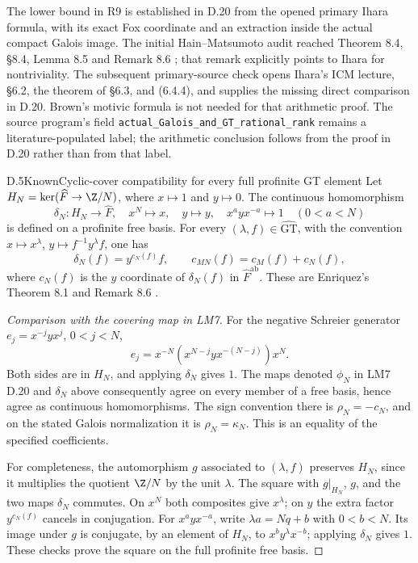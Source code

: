 The lower bound in R9 is established in D.20 from the opened primary
Ihara formula, with its exact Fox coordinate and an extraction inside
the actual compact Galois image. The initial Hain--Matsumoto audit
reached Theorem 8.4, \S8.4, Lemma 8.5 and Remark 8.6
\cite{DE_HainMatsumoto2003}; that remark explicitly points to Ihara
for nontriviality. The subsequent primary-source check opens Ihara's
ICM lecture, \S6.2, the theorem of \S6.3, and (6.4.4), and supplies
the missing direct comparison in D.20. Brown's motivic formula
\cite[(1.3)]{DE_Brown2015} is not needed for that arithmetic proof.
The source program's field
\texttt{actual\_Galois\_and\_GT\_rational\_rank} remains a
literature-populated label; the arithmetic conclusion follows from
the proof in D.20 rather than from that label.

\begin{statement}{D.5}{Known}{Cyclic-cover compatibility for every full profinite GT element}
Let $H_N=\ker(\widehat F\to\Z/N)$, where $x\mapsto1$ and $y\mapsto0$.
The continuous homomorphism
\[
 \delta_N:H_N\longrightarrow\widehat F,
 \quad x^N\mapsto x,\quad y\mapsto y,\quad
 x^ayx^{-a}\mapsto1\quad(0<a<N)
\]
is defined on a profinite free basis. For every
$(\lambda,f)\in\widehat{\mathrm{GT}}$, with the convention
$x\mapsto x^\lambda$, $y\mapsto f^{-1}y^\lambda f$, one has
\[
 \delta_N(f)=y^{c_N(f)}f,\qquad
 c_{MN}(f)=c_M(f)+c_N(f),
\]
where $c_N(f)$ is the $y$ coordinate of $\delta_N(f)$ in
$\widehat F^{\mathrm{ab}}$. These are Enriquez's Theorem 8.1 and
Remark 8.6 \cite{DE_Enriquez2007}.
\end{statement}
\begin{proof}[Comparison with the covering map in LM7]
For the negative Schreier generator $e_j=x^{-j}yx^j$, $0<j<N$,
\[
 e_j=x^{-N}(x^{N-j}yx^{-(N-j)})x^N.
\]
Both sides are in $H_N$, and applying $\delta_N$ gives $1$.
The maps denoted $\phi_N$ in LM7 D.20 and $\delta_N$ above consequently
agree on every member of a free basis, hence agree as continuous
homomorphisms. The sign convention there is
$\rho_N=-c_N$, and on the stated Galois normalization it is
$\rho_N=\kappa_N$. This is an equality of the specified coefficients.

For completeness, the automorphism $g$ associated to $(\lambda,f)$
preserves $H_N$, since it multiplies the quotient $\Z/N$ by the unit
$\lambda$. The square with $g|_{H_N}$, $g$, and the two maps
$\delta_N$ commutes. On $x^N$ both composites give $x^\lambda$;
on $y$ the extra factor $y^{c_N(f)}$ cancels in conjugation.
For $x^ayx^{-a}$, write $\lambda a=Nq+b$ with
$0<b<N$. Its image under $g$ is conjugate, by an element of $H_N$,
to $x^by^\lambda x^{-b}$; applying $\delta_N$ gives $1$.
These checks prove the square on the full profinite free basis.
\end{proof}

